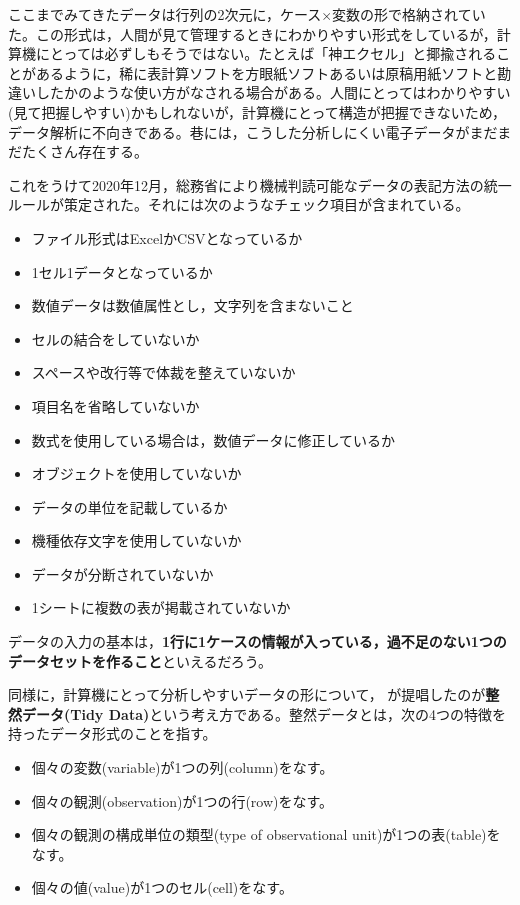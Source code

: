 \documentclass[
  a4paper,
]{ltjsbook}
\providecommand{\tightlist}{%
  \setlength{\itemsep}{0pt}\setlength{\parskip}{0pt}}\usepackage{longtable,booktabs,array}
\begin{document}
ここまでみてきたデータは行列の2次元に，ケース\(\times\)変数の形で格納されていた。この形式は，人間が見て管理するときにわかりやすい形式をしているが，計算機にとっては必ずしもそうではない。たとえば「神エクセル」と揶揄されることがあるように，稀に表計算ソフトを方眼紙ソフトあるいは原稿用紙ソフトと勘違いしたかのような使い方がなされる場合がある。人間にとってはわかりやすい(見て把握しやすい)かもしれないが，計算機にとって構造が把握できないため，データ解析に不向きである。巷には，こうした分析しにくい電子データがまだまだたくさん存在する。

これをうけて2020年12月，総務省により機械判読可能なデータの表記方法の統一ルールが策定された\autocite{soumu}。それには次のようなチェック項目が含まれている。

\begin{itemize}
\tightlist
\item
  ファイル形式はExcelかCSVとなっているか
\item
  1セル1データとなっているか
\item
  数値データは数値属性とし，文字列を含まないこと
\item
  セルの結合をしていないか
\item
  スペースや改行等で体裁を整えていないか
\item
  項目名を省略していないか
\item
  数式を使用している場合は，数値データに修正しているか
\item
  オブジェクトを使用していないか
\item
  データの単位を記載しているか
\item
  機種依存文字を使用していないか
\item
  データが分断されていないか
\item
  1シートに複数の表が掲載されていないか
\end{itemize}

データの入力の基本は，\textbf{1行に1ケースの情報が入っている，過不足のない1つのデータセットを作ること}といえるだろう。

同様に，計算機にとって分析しやすいデータの形について，\textcite{Hadley2014}
が提唱したのが\textbf{整然データ(Tidy
Data)}という考え方である。整然データとは，次の4つの特徴を持ったデータ形式のことを指す。

\begin{itemize}
\tightlist
\item
  個々の変数(variable)が1つの列(column)をなす。
\item
  個々の観測(observation)が1つの行(row)をなす。
\item
  個々の観測の構成単位の類型(type of observational
  unit)が1つの表(table)をなす。
\item
  個々の値(value)が1つのセル(cell)をなす。
\end{itemize}
\end{document}

